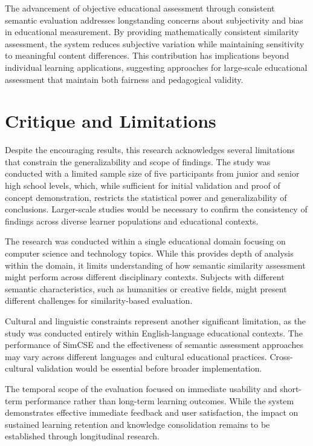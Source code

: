 {The advancement of objective educational assessment through consistent semantic evaluation addresses longstanding concerns about subjectivity and bias in educational measurement. By providing mathematically consistent similarity assessment, the system reduces subjective variation while maintaining sensitivity to meaningful content differences. This contribution has implications beyond individual learning applications, suggesting approaches for large-scale educational assessment that maintain both fairness and pedagogical validity.

\section{Critique and Limitations}

Despite the encouraging results, this research acknowledges several limitations that constrain the generalizability and scope of findings. The study was conducted with a limited sample size of five participants from junior and senior high school levels, which, while sufficient for initial validation and proof of concept demonstration, restricts the statistical power and generalizability of conclusions. Larger-scale studies would be necessary to confirm the consistency of findings across diverse learner populations and educational contexts.

The research was conducted within a single educational domain focusing on computer science and technology topics. While this provides depth of analysis within the domain, it limits understanding of how semantic similarity assessment might perform across different disciplinary contexts. Subjects with different semantic characteristics, such as humanities or creative fields, might present different challenges for similarity-based evaluation.

Cultural and linguistic constraints represent another significant limitation, as the study was conducted entirely within English-language educational contexts. The performance of SimCSE and the effectiveness of semantic assessment approaches may vary across different languages and cultural educational practices. Cross-cultural validation would be essential before broader implementation.

The temporal scope of the evaluation focused on immediate usability and short-term performance rather than long-term learning outcomes. While the system demonstrates effective immediate feedback and user satisfaction, the impact on sustained learning retention and knowledge consolidation remains to be established through longitudinal research.

}
